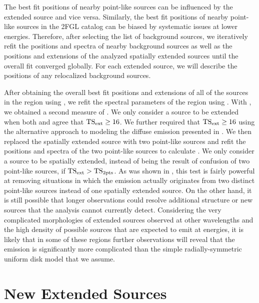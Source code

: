 The best fit positions of nearby point-like sources can be influenced by
the extended source and vice versa.  Similarly, the best fit positions
of nearby point-like sources in the 2FGL catalog can be biased by
systematic issues at lower energies.  Therefore, after selecting the list
of background sources, we iteratively refit the positions and spectra
of nearby background sources as well as the positions and extensions of
the analyzed spatially extended sources until the overall fit converged
globally.  For each extended source, we will describe the positions of
any relocalized background sources.

After obtaining the overall best fit positions and extensions of all
of the sources in the region using \pointlike, we refit the spectral
parameters of the region using \gtlike.  With \gtlike, we obtained a
second measure of \tsext.  We only consider a source to be extended
when both \pointlike and \gtlike agree that $\mathrm{TS}_\mathrm{ext}\ge16$.  We further
required that $\mathrm{TS}_\mathrm{ext}\ge16$ using the alternative approach to modeling
the diffuse emission presented in .
We then replaced the spatially extended source with two point-like sources
and refit the positions and spectra of the two point-like sources to
calculate \tsinc.  We only consider a source to be spatially extended,
instead of being the result of confusion of two point-like sources,
if $\mathrm{TS}_\mathrm{ext}>\mathrm{TS}_{\mathrm{2pts}}$.  As was shown in ,
this test is fairly powerful at removing situations in which the emission
actually originates from two distinct point-like sources instead of one
spatially extended source.  On the other hand, it is still possible that
longer observations could resolve additional structure or new sources that
the analysis cannot currently detect.  Considering the very complicated
morphologies of extended sources observed at other wavelengths and
the high density of possible sources that are expected to emit at \gev
energies, it is likely that in some of these regions further observations
will reveal that the emission is significantly more complicated than
the simple radially-symmetric uniform disk model that we assume.

\section{New Extended Sources}



